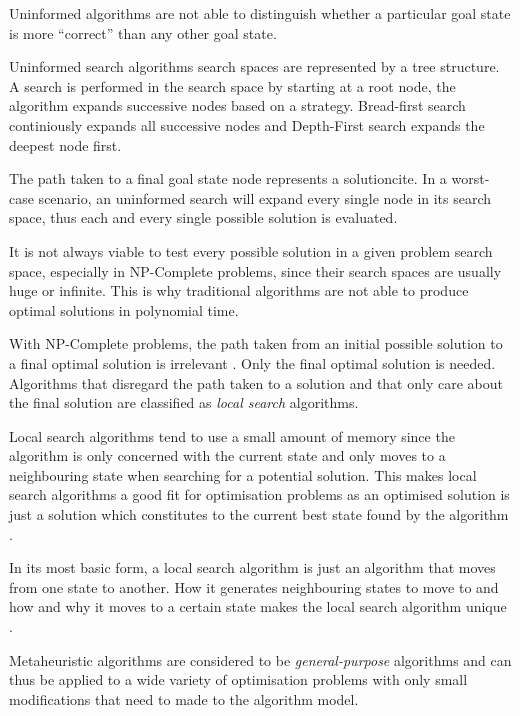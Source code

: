 Uninformed algorithms are not able to distinguish whether a particular goal state is more ``correct'' than any other goal state\cite{AIModernApproach}.

Uninformed search algorithms search spaces are represented by a tree structure\cite{AIModernApproach}. A search is performed in the search space by starting at a root node, the algorithm expands successive nodes based on a strategy\cite{AIModernApproach}. Bread-first search continiously expands all successive nodes and Depth-First search expands the deepest node first\cite{AIModernApproach}.

The path taken to a final  goal state node represents a solutioncite\cite{AIModernApproach}. In a worst-case scenario, an uninformed search will expand every single node in its search space, thus each and every single possible solution is evaluated\cite{AIModernApproach}.

It is not always viable to test every possible solution in a given problem search space, especially in NP-Complete problems, since their search spaces are usually huge or infinite. This is why traditional algorithms are not able to produce optimal solutions in polynomial time\cite{AIModernApproach}.

With NP-Complete problems, the path taken from an initial possible solution to a final optimal solution is irrelevant \cite{AIModernApproach}. Only the final optimal solution is needed. Algorithms that disregard the path taken to a solution and that only care about the final solution are classified as \emph{local search} algorithms\cite{AIModernApproach}.

Local search algorithms tend to use a small amount of memory since the algorithm is only concerned with the current state and only moves to a neighbouring state when searching for a potential solution. This makes local search algorithms a good fit for optimisation problems as an optimised solution is just a solution which constitutes to the current best state found by the algorithm \cite{AIModernApproach,NonlinearGlobalTabu}. 

In its most basic form, a local search algorithm is just an algorithm that moves from one state to another. How it generates neighbouring states to move to and how and why it moves to a certain state makes the local search algorithm unique \cite{AIModernApproach,CompuIntelligenceIntro,NonlinearGlobalTabu}.

Metaheuristic algorithms are considered to be \emph{general-purpose} algorithms and can thus be applied to a wide variety of optimisation problems with only small modifications that need to made to the algorithm model\cite{MetaGraph}.

